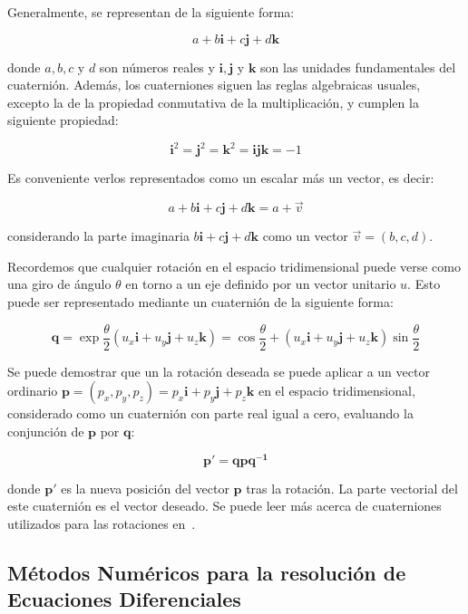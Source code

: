 Generalmente, se representan de la siguiente forma:

\[a + b\boldsymbol{i} + c\boldsymbol{j} + d\boldsymbol{k} \] 

donde $a,b,c$ y $d$ son números reales y $\boldsymbol{i}, \boldsymbol{j}$ y
$\boldsymbol{k}$ son las unidades fundamentales del cuaternión. Además, los
cuaterniones  siguen las reglas algebraicas usuales, excepto la de la propiedad
conmutativa de la multiplicación, y cumplen la siguiente propiedad:

\[\boldsymbol{i}^2 = \boldsymbol{j}^2 = \boldsymbol{k}^2 = \boldsymbol{ijk} = -1 \]

Es conveniente verlos representados como un escalar más un vector, es decir:

\[a + b\boldsymbol{i} + c\boldsymbol{j} + d\boldsymbol{k} = a +
\overrightarrow{v} \] 

considerando la parte imaginaria $b\boldsymbol{i} + c\boldsymbol{j} +
d\boldsymbol{k}$ como un vector $\overrightarrow{v} = (b,c,d)$. 

Recordemos que cualquier rotación en el espacio tridimensional puede verse como
una giro de ángulo $\theta$ en torno a un eje definido por un vector unitario
$u$. Esto puede ser representado mediante un cuaternión de la siguiente forma:

\[\boldsymbol{q} = \exp{\frac{\theta}{2}(u_x\boldsymbol{i} + u_y\boldsymbol{j} +
		u_z\boldsymbol{k})} = \cos{\frac{\theta}{2}} + (u_x\boldsymbol{i} + 
u_y\boldsymbol{j} + u_z\boldsymbol{k})\sin{\frac{\theta}{2}} \]

Se puede demostrar que un la rotación deseada se puede aplicar a un vector
ordinario $\boldsymbol{p} = (p_x, p_y, p_z) = p_x\boldsymbol{i} +
p_y\boldsymbol{j} + p_z\boldsymbol{k}$ en el espacio tridimensional, considerado
como un cuaternión con parte real igual a cero, evaluando la conjunción de
$\boldsymbol{p}$ por $\boldsymbol{q}$:

\[ \boldsymbol{p'} = \boldsymbol{qpq^{-1}} \]

donde $\boldsymbol{p'}$ es la nueva posición del vector $\boldsymbol{p}$ tras la
rotación. La parte vectorial del este cuaternión es el vector deseado. Se puede
leer más acerca de cuaterniones utilizados para las rotaciones en~\citet{Vicci}.

\subsection{Métodos Numéricos para la resolución de Ecuaciones Diferenciales} 
\label{makereference5.4.3}


